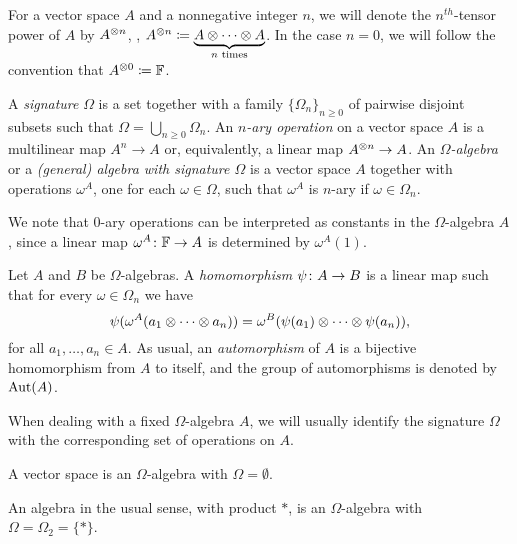 \begin{notation}
    For a vector space $A$ and a nonnegative integer $n$, we will denote the $n^{th}$-tensor power of $A$ by $A^{\otimes n}$, \ie,
    $A^{\otimes n} \coloneqq \underbrace{A\otimes\cdots\otimes A}_{n \text{ times}}$. 
    In the case $n = 0$, we will follow the convention that $A^{\otimes 0} \coloneqq \mathbb{F}$.
\end{notation}

\begin{defi}\label{def:universal-algebra}
    A \emph{signature} $\Omega$ is a set together with a family $\{ \Omega_n \}_{n \geq 0}$ of pairwise disjoint subsets such that $\Omega = \bigcup_{n \geq 0} \Omega_n$. 
    An \emph{$n$-ary operation} on a vector space $A$ is a multilinear map $A^n \to A$ or, equivalently, a linear map $A^{\otimes n} \to A$. 
    An \emph{$\Omega$-algebra} or a \emph{(general) algebra with signature $\Omega$} is a vector space $A$ together with operations $\omega^A$, one for each $\omega \in \Omega$, such that $\omega^A$ is $n$-ary if $\omega \in \Omega_n$.
\end{defi}

We note that $0$-ary operations can be interpreted as constants in the $\Omega$-algebra $A$, since a linear map $\omega^A\colon \mathbb{F} \to A$ is determined by $\omega^A(1)$.

\begin{defi}
    Let $A$ and $B$ be $\Omega$-algebras. 
    A \emph{homomorphism} $\psi\colon A \to B$ is a linear map such that for every $\omega \in \Omega_n$ we have
    \[
        \psi( \omega^A (a_1 \otimes \cdots \otimes a_n) ) = \omega^B ( \psi(a_1) \otimes \cdots \otimes \psi(a_n) ),
    \]
    for all $a_1, \ldots, a_n \in A$. 
    As usual, an \emph{automorphism} of $A$ is a bijective homomorphism from $A$ to itself, and the group of automorphisms is denoted by $\operatorname{Aut}(A)$.
\end{defi}

When dealing with a fixed $\Omega$-algebra $A$, we will usually identify the signature $\Omega$ with the corresponding set of operations on $A$.

\begin{ex}\label{ex:omega-vec-space}
    A vector space is an $\Omega$-algebra with $\Omega = \emptyset$.
\end{ex}

\begin{ex}\label{ex:omega-algebra}
    An algebra in the usual sense, with product $*$, is an $\Omega$-algebra with $\Omega = \Omega_2 = \{ * \}$. 
\end{ex}

